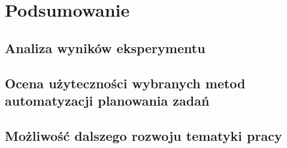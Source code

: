 \section{Podsumowanie}\label{section_summary}
\subsection{Analiza wyników eksperymentu}\label{section_summary_results}
\subsection{Ocena użyteczności wybranych metod automatyzacji planowania zadań}\label{section_summary_verdict}
\subsection{Możliwość dalszego rozwoju tematyki pracy}\label{section_summary_expand}